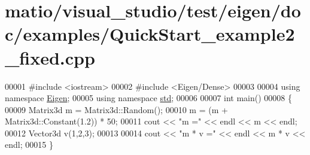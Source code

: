 \hypertarget{matio_2visual__studio_2test_2eigen_2doc_2examples_2_quick_start__example2__fixed_8cpp_source}{}\section{matio/visual\+\_\+studio/test/eigen/doc/examples/\+Quick\+Start\+\_\+example2\+\_\+fixed.cpp}
\label{matio_2visual__studio_2test_2eigen_2doc_2examples_2_quick_start__example2__fixed_8cpp_source}

\begin{DoxyCode}
00001 \textcolor{preprocessor}{#include <iostream>}
00002 \textcolor{preprocessor}{#include <Eigen/Dense>}
00003 
00004 \textcolor{keyword}{using namespace }\hyperlink{namespace_eigen}{Eigen};
00005 \textcolor{keyword}{using namespace }\hyperlink{namespacestd}{std};
00006 
00007 \textcolor{keywordtype}{int} main()
00008 \{
00009   Matrix3d m = Matrix3d::Random();
00010   m = (m + Matrix3d::Constant(1.2)) * 50;
00011   cout << \textcolor{stringliteral}{"m ="} << endl << m << endl;
00012   Vector3d v(1,2,3);
00013   
00014   cout << \textcolor{stringliteral}{"m * v ="} << endl << m * v << endl;
00015 \}
\end{DoxyCode}
